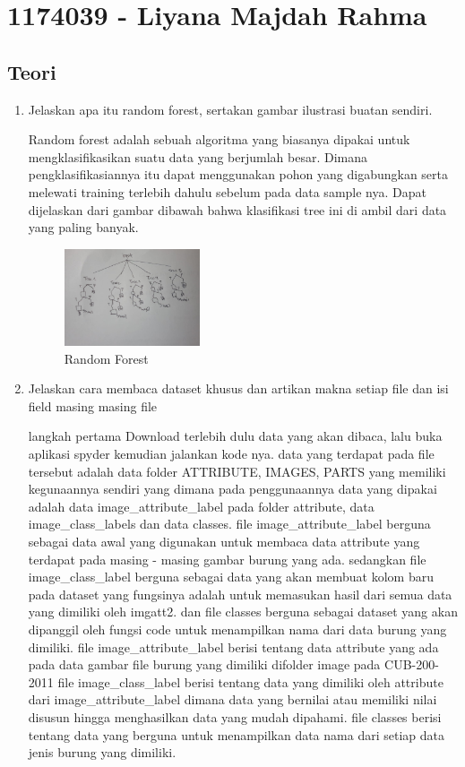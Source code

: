 \section{1174039 - Liyana Majdah Rahma}
    \subsection{Teori}
    \begin{enumerate}
        \item Jelaskan apa itu random forest, sertakan gambar ilustrasi buatan sendiri.\par
        Random forest adalah sebuah algoritma yang biasanya dipakai untuk mengklasifikasikan suatu data yang berjumlah besar. Dimana pengklasifikasiannya itu dapat menggunakan pohon yang digabungkan serta melewati training terlebih dahulu sebelum pada data sample nya. Dapat dijelaskan dari gambar dibawah bahwa klasifikasi tree ini di ambil dari data yang paling banyak.
        \begin{figure}[H]
            \includegraphics[width=4cm]{figures/1174039/chapter3/tree.jpeg}
            \centering
            \caption{Random Forest}
        \end{figure}

        \item Jelaskan cara membaca dataset khusus dan artikan makna setiap ﬁle dan isi ﬁeld masing masing ﬁle 
\par
        langkah pertama Download terlebih dulu data yang akan dibaca, lalu buka aplikasi spyder kemudian jalankan kode nya. data yang terdapat pada file tersebut adalah data folder ATTRIBUTE, IMAGES, PARTS yang memiliki kegunaannya sendiri yang dimana pada penggunaannya data yang dipakai adalah data image\_attribute\_label pada folder attribute, data image\_class\_labels dan data classes.
        file image\_attribute\_label berguna sebagai data awal yang digunakan untuk membaca data attribute yang terdapat pada masing - masing gambar burung yang ada.
        sedangkan file image\_class\_label berguna sebagai data yang akan membuat kolom baru pada dataset yang fungsinya adalah untuk memasukan hasil dari semua data yang dimiliki oleh imgatt2.
        dan file classes berguna sebagai dataset yang akan dipanggil oleh fungsi code untuk menampilkan nama dari data burung yang dimiliki. file image\_attribute\_label
        berisi tentang data attribute yang ada pada data gambar file burung yang dimiliki difolder image pada CUB-200-2011
        file image\_class\_label
        berisi tentang data yang dimiliki oleh attribute dari image\_attribute\_label dimana data yang bernilai atau memiliki nilai disusun hingga menghasilkan data yang mudah dipahami.
        file classes
        berisi tentang data yang berguna untuk menampilkan data nama dari setiap data jenis burung yang dimiliki.


\end{enumerate}
